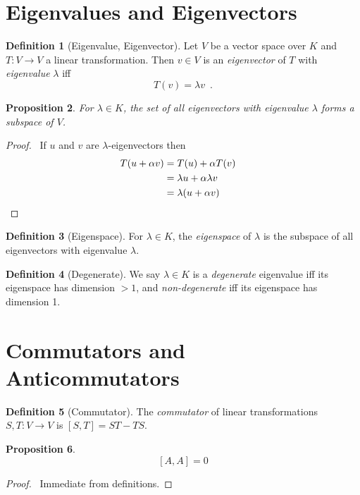 \documentclass{book}
\let\qed\relax
\newtheorem{prop}{Proposition}[chapter]
\theoremstyle{definition}
\newtheorem{df}[prop]{Definition}
\begin{document}
\section{Eigenvalues and Eigenvectors}

\begin{df}[Eigenvalue, Eigenvector]
Let $V$ be a vector space over $K$ and $T : V \rightarrow V$ a linear transformation. Then $v \in V$ is an \emph{eigenvector} of $T$ with \emph{eigenvalue} $\lambda$ iff
\[ T(v) = \lambda v \enspace . \]
\end{df}

\begin{prop}
For $\lambda \in K$, the set of all eigenvectors with eigenvalue $\lambda$ forms a subspace of $V$.
\end{prop}

\begin{proof}
\pf\ If $u$ and $v$ are $\lambda$-eigenvectors then
\begin{align*}
T(u + \alpha v) & = T(u) + \alpha T(v) \\
& = \lambda u + \alpha \lambda v \\
& = \lambda (u + \alpha v) & \qed
\end{align*}
\end{proof}

\begin{df}[Eigenspace]
For $\lambda \in K$, the \emph{eigenspace} of $\lambda$ is the subspace of all eigenvectors with eigenvalue $\lambda$.
\end{df}

\begin{df}[Degenerate]
We say $\lambda \in K$ is a \emph{degenerate} eigenvalue iff its eigenspace has dimension $> 1$, and \emph{non-degenerate} iff its eigenspace has dimension 1.
\end{df}

\section{Commutators and Anticommutators}

\begin{df}[Commutator]
The \emph{commutator} of linear transformations $S,T : V \rightarrow V$ is $[S,T] = ST - TS$.
\end{df}

\begin{prop}
\[ [A,A] = 0 \]
\end{prop}

\begin{proof}
\pf\ Immediate from definitions. \qed
\end{proof}
\end{document}
